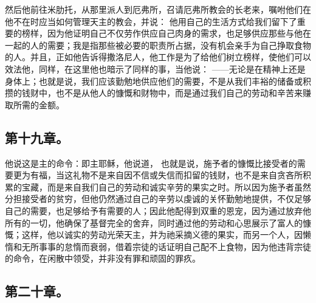 然后他前往米肋托，从那里派人到厄弗所，召请厄弗所教会的长老来，嘱咐他们在他不在时应当如何管理天主的教会，并说：  他用自己的生活方式给我们留下了重要的榜样，因为他证明自己不仅劳作供应自己肉身的需求，也足够供应那些与他在一起的人的需要；我是指那些被必要的职责所占据，没有机会亲手为自己挣取食物的人。并且，正如他告诉得撒洛尼人，他工作是为了给他们树立榜样，使他们可以效法他，同样，在这里他也暗示了同样的事，当他说： ——无论是在精神上还是身体上；也就是说，我们应该勤勉地供应他们的需要，不是从我们丰裕的储备或积攒的钱财中，也不是从他人的慷慨和财物中，而是通过我们自己的劳动和辛苦来赚取所需的金额。\par


\subsection{第十九章。}

\par

他说这是主的命令：即主耶稣，他说道， 也就是说，施予者的慷慨比接受者的需要更为有福，当这礼物不是来自因不信或失信而扣留的钱财，也不是来自贪吝所积累的宝藏，而是来自我们自己的劳动和诚实辛劳的果实之时。所以因为施予者虽然分担接受者的贫穷，但他仍然通过自己的辛劳以虔诚的关怀勤勉地提供，不仅足够自己的需要，也足够给予有需要的人；因此他配得到双重的恩宠，因为通过放弃他所有的一切，他确保了基督完全的舍弃，同时通过他的劳动和心思展示了富人的慷慨；这样，他以诚实的劳动光荣天主，并为祂采摘义德的果实，而另一个人，因懒惰和无所事事的怠惰而衰弱，借着宗徒的话证明自己配不上食物，因为他违背宗徒的命令，在闲散中领受，并非没有罪和顽固的罪疚。\par


\subsection{第二十章。}

